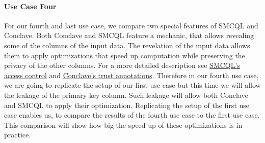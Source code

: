 \paragraph{Use Case Four}
For our fourth and last use case, we compare two special features of SMCQL and Conclave. Both Conclave and SMCQL feature a mechanic, that allows revealing some of the columns of the input data. The revelation of the input data allows them to apply optimizations that speed up computation while preserving the privacy of the other columns. For a more detailed description see \hyperref[Accesses_label]{SMCQL's access control} and \hyperref[Trust_label]{Conclave's trust annotations}. Therefore in our fourth use case, we are going to replicate the setup of our first use case but this time we will allow the leakage of the primary key column. Such leakage will allow both Conclave and SMCQL to apply their optimization. Replicating the setup of the first use case enables us, to compare the results of the fourth use case to the first use case. This comparison will show how big the speed up of these optimizations is in practice. 
















